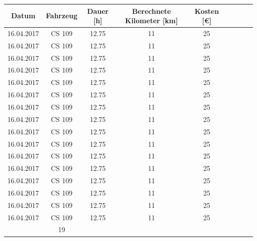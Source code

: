 \documentclass[
	pagenumber=false, %
	parskip=half, %
	fromalign=right, %
	foldmarks=true, %
	addrfield=true %
	firstfoot=on %
    ]{scrlttr2}
\begin{document}
\newpage
\begin{tabular}{ | c | c | c | c | c | c | c | c | c | }
\hline
Datum & Fahrzeug & Dauer [h] & Berechnete Kilometer [km]& Kosten [\euro{}]\\ \hline
16.04.2017 & CS 109 & 12.75 & 11 & 25 \\ 
16.04.2017 & CS 109 & 12.75 & 11 & 25 \\ 
16.04.2017 & CS 109 & 12.75 & 11 & 25 \\ 
16.04.2017 & CS 109 & 12.75 & 11 & 25 \\ 
16.04.2017 & CS 109 & 12.75 & 11 & 25 \\ 
16.04.2017 & CS 109 & 12.75 & 11 & 25 \\ 
16.04.2017 & CS 109 & 12.75 & 11 & 25 \\ 
16.04.2017 & CS 109 & 12.75 & 11 & 25 \\ 
16.04.2017 & CS 109 & 12.75 & 11 & 25 \\ 
16.04.2017 & CS 109 & 12.75 & 11 & 25 \\ 
16.04.2017 & CS 109 & 12.75 & 11 & 25 \\ 
16.04.2017 & CS 109 & 12.75 & 11 & 25 \\ 
16.04.2017 & CS 109 & 12.75 & 11 & 25 \\ 
16.04.2017 & CS 109 & 12.75 & 11 & 25 \\ 
16.04.2017 & CS 109 & 12.75 & 11 & 25 \\ 
16.04.2017 & CS 109 & 12.75 & 11 & 25 \\ 
\hhline{|-|-|-|-|=|}
\multicolumn{4}{|r|}{Summe:} &19\\\hline
\end{tabular}
\end{document}
